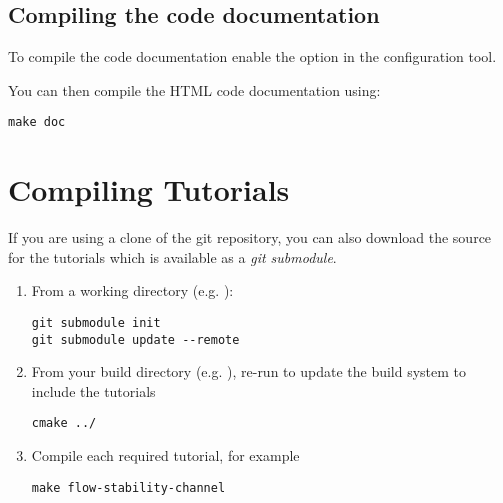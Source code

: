 \subsection{Compiling the code documentation}
To compile the code documentation enable the  option
in the  configuration tool.

You can then compile the HTML code documentation using:
\begin{lstlisting}[style=BashInputStyle]
make doc
\end{lstlisting}


\section{Compiling Tutorials}
If you are using a clone of the \nekpp git repository, you can also download
the source for the \nekpp tutorials which is available as a \emph{git submodule}.

\begin{enumerate}
\item From a \nekpp working directory (e.g. ):
\begin{lstlisting}[style=BashInputStyle]
git submodule init
git submodule update --remote
\end{lstlisting}
\item From your build directory (e.g. ), re-run  to update the build system to include the tutorials
\begin{lstlisting}[style=BashInputStyle]
cmake ../
\end{lstlisting}
\item Compile each required tutorial, for example
\begin{lstlisting}[style=BashInputStyle]
make flow-stability-channel
\end{lstlisting}
\end{enumerate}

